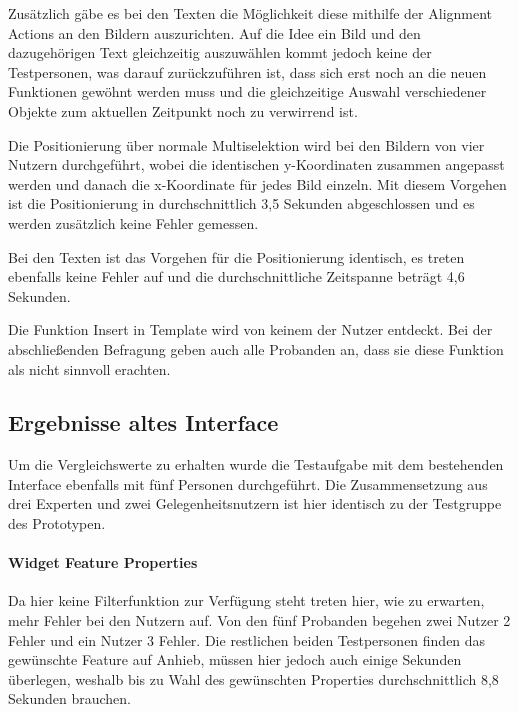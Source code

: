 Zusätzlich gäbe es bei den Texten die Möglichkeit diese mithilfe der Alignment Actions an den Bildern auszurichten.
Auf die Idee ein Bild und den dazugehörigen Text gleichzeitig auszuwählen kommt jedoch keine der Testpersonen, was darauf zurückzuführen ist, dass sich erst noch an die neuen Funktionen gewöhnt werden muss und die gleichzeitige Auswahl verschiedener Objekte zum aktuellen Zeitpunkt noch zu verwirrend ist.

Die Positionierung über normale Multiselektion wird bei den Bildern von vier Nutzern durchgeführt, wobei die identischen y-Koordinaten zusammen angepasst werden und danach die x-Koordinate für jedes Bild einzeln.
Mit diesem Vorgehen ist die Positionierung in durchschnittlich 3,5 Sekunden abgeschlossen und es werden zusätzlich keine Fehler gemessen.

Bei den Texten ist das Vorgehen für die Positionierung identisch, es treten ebenfalls keine Fehler auf und die durchschnittliche Zeitspanne beträgt 4,6 Sekunden.

Die Funktion \glqq Insert in Template\grqq{} wird von keinem der Nutzer entdeckt. Bei der abschließenden Befragung geben auch alle Probanden an, dass sie diese Funktion als nicht sinnvoll erachten.

\subsection{Ergebnisse altes Interface}
Um die Vergleichswerte zu erhalten wurde die Testaufgabe mit dem bestehenden Interface ebenfalls mit fünf Personen durchgeführt.
Die Zusammensetzung aus drei Experten und zwei Gelegenheitsnutzern ist hier identisch zu der Testgruppe des Prototypen.

\paragraph{Widget Feature Properties}
Da hier keine Filterfunktion zur Verfügung steht treten hier, wie zu erwarten, mehr Fehler bei den Nutzern auf.
Von den fünf Probanden begehen zwei Nutzer 2 Fehler und ein Nutzer 3 Fehler.
Die restlichen beiden Testpersonen finden das gewünschte Feature auf Anhieb, müssen hier jedoch auch einige Sekunden überlegen, weshalb bis zu Wahl des gewünschten Properties durchschnittlich 8,8 Sekunden brauchen.

